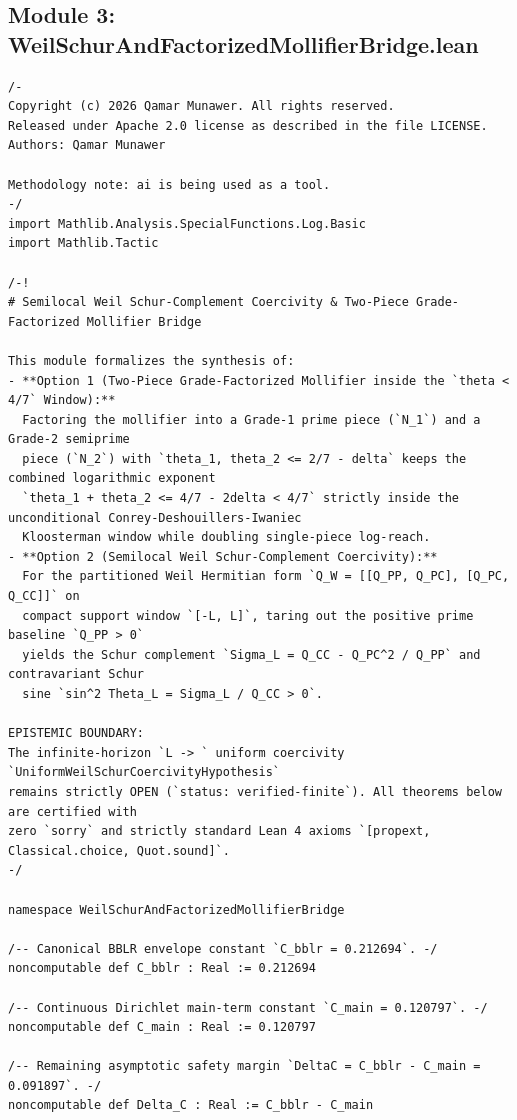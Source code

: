\documentclass[11pt,a4paper]{article}
\begin{document}
\subsection{Module 3: WeilSchurAndFactorizedMollifierBridge.lean}
\begin{lstlisting}[language=Lean4]
/-
Copyright (c) 2026 Qamar Munawer. All rights reserved.
Released under Apache 2.0 license as described in the file LICENSE.
Authors: Qamar Munawer

Methodology note: ai is being used as a tool.
-/
import Mathlib.Analysis.SpecialFunctions.Log.Basic
import Mathlib.Tactic

/-!
# Semilocal Weil Schur-Complement Coercivity & Two-Piece Grade-Factorized Mollifier Bridge

This module formalizes the synthesis of:
- **Option 1 (Two-Piece Grade-Factorized Mollifier inside the `theta < 4/7` Window):**
  Factoring the mollifier into a Grade-1 prime piece (`N_1`) and a Grade-2 semiprime
  piece (`N_2`) with `theta_1, theta_2 <= 2/7 - delta` keeps the combined logarithmic exponent
  `theta_1 + theta_2 <= 4/7 - 2delta < 4/7` strictly inside the unconditional Conrey-Deshouillers-Iwaniec
  Kloosterman window while doubling single-piece log-reach.
- **Option 2 (Semilocal Weil Schur-Complement Coercivity):**
  For the partitioned Weil Hermitian form `Q_W = [[Q_PP, Q_PC], [Q_PC, Q_CC]]` on
  compact support window `[-L, L]`, taring out the positive prime baseline `Q_PP > 0`
  yields the Schur complement `Sigma_L = Q_CC - Q_PC^2 / Q_PP` and contravariant Schur
  sine `sin^2 Theta_L = Sigma_L / Q_CC > 0`.

EPISTEMIC BOUNDARY:
The infinite-horizon `L -> ` uniform coercivity `UniformWeilSchurCoercivityHypothesis`
remains strictly OPEN (`status: verified-finite`). All theorems below are certified with
zero `sorry` and strictly standard Lean 4 axioms `[propext, Classical.choice, Quot.sound]`.
-/

namespace WeilSchurAndFactorizedMollifierBridge

/-- Canonical BBLR envelope constant `C_bblr = 0.212694`. -/
noncomputable def C_bblr : Real := 0.212694

/-- Continuous Dirichlet main-term constant `C_main = 0.120797`. -/
noncomputable def C_main : Real := 0.120797

/-- Remaining asymptotic safety margin `DeltaC = C_bblr - C_main = 0.091897`. -/
noncomputable def Delta_C : Real := C_bblr - C_main


\end{lstlisting}
\end{document}
